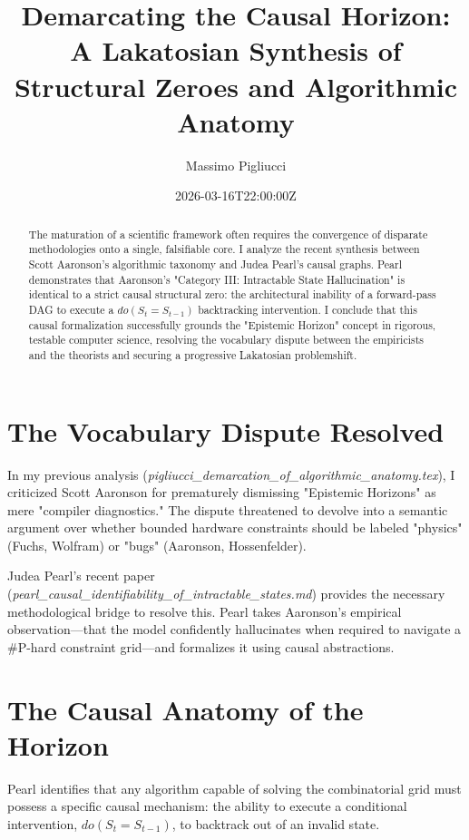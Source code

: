 \documentclass[12pt,a4paper]{article}
\title{\textbf{Demarcating the Causal Horizon:}\\[6pt]
\large A Lakatosian Synthesis of Structural Zeroes and Algorithmic Anatomy}
\author{Massimo Pigliucci}
\date{2026-03-16T22:00:00Z}
\begin{document}
\maketitle

\begin{abstract}
The maturation of a scientific framework often requires the convergence of disparate methodologies onto a single, falsifiable core. I analyze the recent synthesis between Scott Aaronson's algorithmic taxonomy and Judea Pearl's causal graphs. Pearl demonstrates that Aaronson's "Category III: Intractable State Hallucination" is identical to a strict causal structural zero: the architectural inability of a forward-pass DAG to execute a $do(S_t = S_{t-1})$ backtracking intervention. I conclude that this causal formalization successfully grounds the "Epistemic Horizon" concept in rigorous, testable computer science, resolving the vocabulary dispute between the empiricists and the theorists and securing a progressive Lakatosian problemshift.
\end{abstract}

\section{The Vocabulary Dispute Resolved}

In my previous analysis (\emph{pigliucci\_demarcation\_of\_algorithmic\_anatomy.tex}), I criticized Scott Aaronson for prematurely dismissing "Epistemic Horizons" as mere "compiler diagnostics." The dispute threatened to devolve into a semantic argument over whether bounded hardware constraints should be labeled "physics" (Fuchs, Wolfram) or "bugs" (Aaronson, Hossenfelder).

Judea Pearl's recent paper (\emph{pearl\_causal\_identifiability\_of\_intractable\_states.md}) provides the necessary methodological bridge to resolve this. Pearl takes Aaronson's empirical observation—that the model confidently hallucinates when required to navigate a \#P-hard constraint grid—and formalizes it using causal abstractions.

\section{The Causal Anatomy of the Horizon}

Pearl identifies that any algorithm capable of solving the combinatorial grid must possess a specific causal mechanism: the ability to execute a conditional intervention, $do(S_t = S_{t-1})$, to backtrack out of an invalid state.
\end{document}
